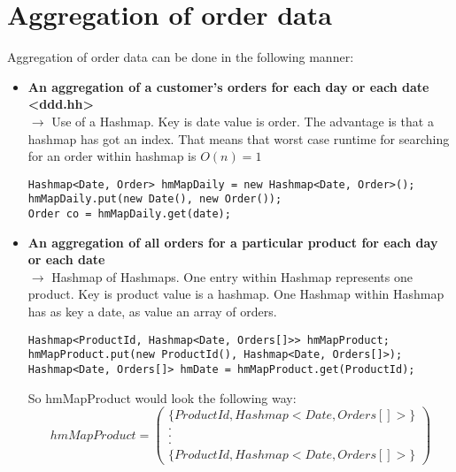 \chapter*{Aggregation of order data}
Aggregation of order data can be done in the following manner:
\begin{itemize}
    \item \textbf{An aggregation of a customer’s orders for each day or each date <ddd.hh>} \\ $\rightarrow$
    Use of a Hashmap. Key is date value is order. The advantage is that a hashmap has got an index.
    That means that worst case runtime for searching for an order within hashmap is $O(n) = 1$
    \begin{lstlisting}
Hashmap<Date, Order> hmMapDaily = new Hashmap<Date, Order>();
hmMapDaily.put(new Date(), new Order());
Order co = hmMapDaily.get(date);
    \end{lstlisting}
    \item \textbf{An aggregation of all orders for a particular product for each day or each date} \\ $\rightarrow$
    Hashmap of Hashmaps. One entry within Hashmap represents one product. Key is product value is a hashmap. One Hashmap within Hashmap has
    as key a date, as value an array of orders.
    \begin{lstlisting}
Hashmap<ProductId, Hashmap<Date, Orders[]>> hmMapProduct;
hmMapProduct.put(new ProductId(), Hashmap<Date, Orders[]>);
Hashmap<Date, Orders[]> hmDate = hmMapProduct.get(ProductId);
    \end{lstlisting}
    So hmMapProduct would look the following way:
    \[hmMapProduct = \begin{pmatrix}
    \{ProductId, Hashmap<Date, Orders[]>\} \\
         . \\
         . \\
         . \\
    \{ProductId, Hashmap<Date, Orders[]>\}
    \end{pmatrix}\]
\end{itemize}